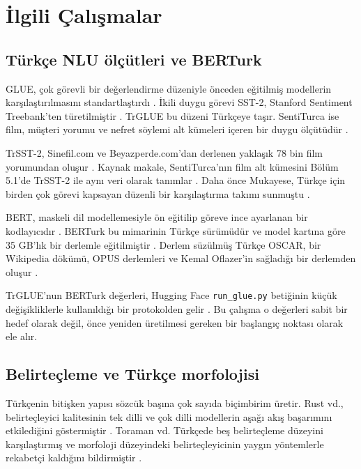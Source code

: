 \documentclass[11pt]{article}
\begin{document}
\section{İlgili Çalışmalar}\label{sec:2}

\subsection{Türkçe NLU ölçütleri ve BERTurk}

GLUE, çok görevli bir değerlendirme düzeniyle önceden eğitilmiş modellerin karşılaştırılmasını standartlaştırdı \citep{wang2018}. İkili duygu görevi SST-2, Stanford Sentiment Treebank'ten türetilmiştir \citep{socher2013}. TrGLUE bu düzeni Türkçeye taşır. SentiTurca ise film, müşteri yorumu ve nefret söylemi alt kümeleri içeren bir duygu ölçütüdür \citep{altinok2025}.

TrSST-2, Sinefil.com ve Beyazperde.com'dan derlenen yaklaşık 78 bin film yorumundan oluşur \citep{altinok2025}. Kaynak makale, SentiTurca'nın film alt kümesini Bölüm 5.1'de TrSST-2 ile aynı veri olarak tanımlar \citep{altinok2025}. Daha önce Mukayese, Türkçe için birden çok görevi kapsayan düzenli bir karşılaştırma takımı sunmuştu \citep{safaya2022}.

BERT, maskeli dil modellemesiyle ön eğitilip göreve ince ayarlanan bir kodlayıcıdır \citep{devlin2019}. BERTurk bu mimarinin Türkçe sürümüdür ve model kartına göre 35 GB'lık bir derlemle eğitilmiştir \citep{schweter2020}. Derlem süzülmüş Türkçe OSCAR, bir Wikipedia dökümü, OPUS derlemleri ve Kemal Oflazer'in sağladığı bir derlemden oluşur \citep{schweter2020}.

TrGLUE'nun BERTurk değerleri, Hugging Face \texttt{run\_\allowbreak{}\allowbreak{}glue.\allowbreak{}\allowbreak{}py} betiğinin küçük değişikliklerle kullanıldığı bir protokolden gelir \citep{altinok2025,wolf2020}. Bu çalışma o değerleri sabit bir hedef olarak değil, önce yeniden üretilmesi gereken bir başlangıç noktası olarak ele alır.

\subsection{Belirteçleme ve Türkçe morfolojisi}

Türkçenin bitişken yapısı sözcük başına çok sayıda biçimbirim üretir. Rust vd., belirteçleyici kalitesinin tek dilli ve çok dilli modellerin aşağı akış başarımını etkilediğini göstermiştir \citep{rust2021}. Toraman vd. Türkçede beş belirteçleme düzeyini karşılaştırmış ve morfoloji düzeyindeki belirteçleyicinin yaygın yöntemlerle rekabetçi kaldığını bildirmiştir \citep{toraman2023}.
\end{document}
